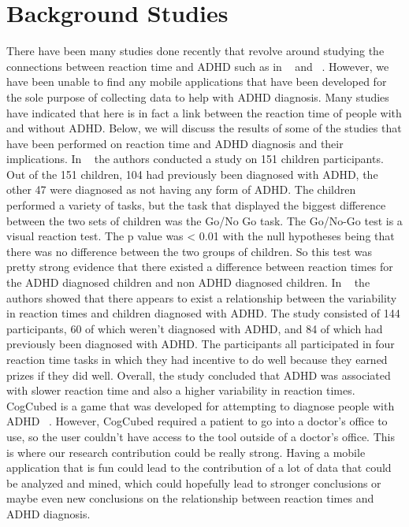 \documentclass[a4wide]{article}
\begin{document}
\section{Background Studies}
\- There have been many studies done recently that revolve around studying the connections between reaction time and ADHD such as in ~\cite{pmid24628425} and ~\cite{Mostofsky:2008:RIR:1362432.1362433}. However, we have been unable to find any mobile applications that have been developed for the sole purpose of collecting data to help with ADHD diagnosis. Many studies have indicated that here is in fact a link between the reaction time of people with and without ADHD. Below, we will discuss the results of some of the studies that have been performed on reaction time and ADHD diagnosis and their implications.
\newline
\newline
\- In ~\cite{pmid21463041} the authors conducted a study on 151 children participants. Out of the 151 children, 104 had previously been diagnosed with ADHD, the other 47 were diagnosed as not having any form of ADHD. The children performed a variety of tasks, but the task that displayed the biggest difference between the two sets of children was the Go/No Go task. The Go/No-Go test is a visual reaction test. The p value was < 0.01 with the null hypotheses being that there was no difference between the two groups of children. So this test was pretty strong evidence that there existed a difference between reaction times for the ADHD diagnosed children and non ADHD diagnosed children.
\newline
\newline
\- In ~\cite{pmid17537284} the authors showed that there appears to exist a relationship between the variability in reaction times and children diagnosed with ADHD. The study consisted of 144 participants, 60 of which weren't diagnosed with ADHD, and 84 of which had previously been diagnosed with ADHD. The participants all participated in four reaction time tasks in which they had incentive to do well because they earned prizes if they did well. Overall, the study concluded that ADHD was associated with slower reaction time and also a higher variability in reaction times.
\newline
\newline
\- CogCubed is a game that was developed for attempting to diagnose people with ADHD ~\cite{Heller2013}. However, CogCubed required a patient to go into a doctor's office to use, so the user couldn't have access to the tool outside of a doctor's office. This is where our research contribution could be really strong. Having a mobile application that is fun could lead to the contribution of a lot of data that could be analyzed and mined, which could hopefully lead to stronger conclusions or maybe even new conclusions on the relationship between reaction times and ADHD diagnosis.
\end{document}
